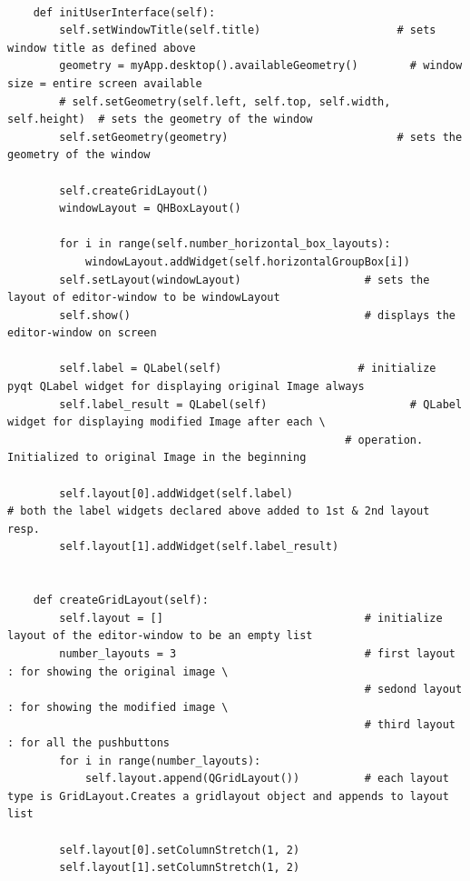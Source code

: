 \documentclass[letterpaper, 10 pt, conference]{ieeeconf}  %
\begin{document}
\begin{mdframed}
\begin{lstlisting}
    
    def initUserInterface(self):
        self.setWindowTitle(self.title)                     # sets window title as defined above
        geometry = myApp.desktop().availableGeometry()        # window size = entire screen available
        # self.setGeometry(self.left, self.top, self.width, self.height)  # sets the geometry of the window
        self.setGeometry(geometry)                          # sets the geometry of the window

        self.createGridLayout()
        windowLayout = QHBoxLayout()

        for i in range(self.number_horizontal_box_layouts):
            windowLayout.addWidget(self.horizontalGroupBox[i])
        self.setLayout(windowLayout)                   # sets the layout of editor-window to be windowLayout
        self.show()                                    # displays the editor-window on screen

        self.label = QLabel(self)                     # initialize pyqt QLabel widget for displaying original Image always
        self.label_result = QLabel(self)                      # QLabel widget for displaying modified Image after each \
                                                    # operation. Initialized to original Image in the beginning 

        self.layout[0].addWidget(self.label)                               # both the label widgets declared above added to 1st & 2nd layout resp.                             
        self.layout[1].addWidget(self.label_result)

    
    def createGridLayout(self):
        self.layout = []                               # initialize layout of the editor-window to be an empty list
        number_layouts = 3                             # first layout : for showing the original image \
                                                       # sedond layout : for showing the modified image \
                                                       # third layout : for all the pushbuttons 
        for i in range(number_layouts):
            self.layout.append(QGridLayout())          # each layout type is GridLayout.Creates a gridlayout object and appends to layout list

        self.layout[0].setColumnStretch(1, 2)
        self.layout[1].setColumnStretch(1, 2)
 

\end{lstlisting}
\end{mdframed}
\end{document}
